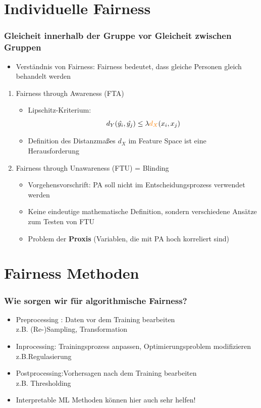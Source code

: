 \documentclass[aspectratio=169]{beamer}
\begin{document}
\section{Individuelle Fairness}
\begin{frame}
    \frametitle{Gleicheit innerhalb der Gruppe vor Gleicheit zwischen Gruppen}
	\begin{itemize}
		\item Verständnis von Fairness: Fairness bedeutet, dass gleiche Personen gleich behandelt werden
	\end{itemize}
    \begin{enumerate}
		\item Fairness through Awareness (FTA)
        \begin{itemize}
            \item Lipschitz-Kriterium\cite{castelnovo2022}:
            \[
            d_Y(\hat{y_i}, \hat{y_j}) \leq \lambda {\color{orange}{d_X}}(x_i, x_j)
            \] 
            \item Definition des {\color{orange}Distanzmaßes $d_X$} im Feature Space ist eine Herausforderung
        \end{itemize}

        \item Fairness through Unawareness (FTU) = Blinding
        \begin{itemize}
            \item Vorgehensvorschrift: PA soll nicht im Entscheidungsprozess verwendet werden
            \item Keine eindeutige mathematische Definition, sondern verschiedene Ansätze zum Testen von FTU
            \item Problem der \textbf{Proxis} (Variablen, die mit PA hoch korreliert sind)
        \end{itemize}
    \end{enumerate}
\end{frame}


\section{Fairness Methoden}
\begin{frame}
	\frametitle{Wie sorgen wir für algorithmische Fairness?}
	\begin{itemize}
		\item Preprocessing \cite{caton2024}: Daten vor dem Training bearbeiten \\ z.B. (Re-)Sampling, Transformation
		\item Inprocessing: Trainingsprozess anpassen, Optimierungsproblem modifizieren \\ z.B.Regulasierung
		\item Postprocessing:Vorhersagen nach dem Training bearbeiten \\ z.B. Thresholding
		\item Interpretable ML Methoden können hier auch sehr helfen!
	\end{itemize}
\end{frame}
\end{document}
